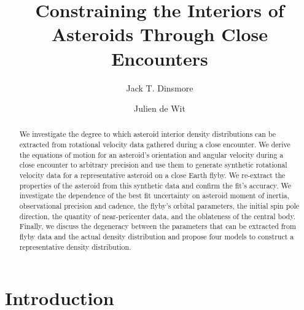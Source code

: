 \documentclass{aastex631}
\begin{document}
\title{Constraining the Interiors of Asteroids Through Close Encounters}


\author[0000-0002-6401-778X]{Jack T. Dinsmore}

\author{Julien de Wit}

\begin{abstract}
We investigate the degree to which asteroid interior density distributions can be extracted from rotational velocity data gathered during a close encounter. We derive the equations of motion for an asteroid's orientation and angular velocity during a close encounter to arbitrary precision and use them to generate synthetic rotational velocity data for a representative asteroid on a close Earth flyby. We re-extract the properties of the asteroid from this synthetic data and confirm the fit's accuracy. We investigate the dependence of the best fit uncertainty on asteroid moment of inertia, observational precision and cadence, the flyby's orbital parameters, the initial spin pole direction, the quantity of near-pericenter data, and the oblateness of the central body. Finally, we discuss the degeneracy between the parameters that can be extracted from flyby data and the actual density distribution and propose four models to construct a representative density distribution.
\end{abstract}




\section{Introduction}
\end{document}
